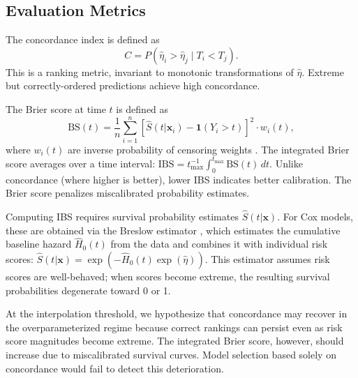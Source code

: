 \documentclass[12pt,a4paper]{article}
\newcommand{\bx}{\bm{x}}
\begin{document}
\subsection{Evaluation Metrics}

The concordance index \citep{harrell1996multivariable} is defined as
\begin{equation}
    C = P(\hat{\eta}_i > \hat{\eta}_j \mid T_i < T_j).
\end{equation}
This is a ranking metric, invariant to monotonic transformations of $\hat{\eta}$. Extreme but correctly-ordered predictions achieve high concordance.

The Brier score at time $t$ \citep{graf1999assessment} is defined as
\begin{equation}
    \text{BS}(t) = \frac{1}{n} \sum_{i=1}^{n} \left[ \hat{S}(t | \bx_i) - \mathbf{1}(Y_i > t) \right]^2 \cdot w_i(t),
\end{equation}
where $w_i(t)$ are inverse probability of censoring weights \citep{gerds2006consistent}. The integrated Brier score averages over a time interval: $\text{IBS} = t_{\max}^{-1} \int_0^{t_{\max}} \text{BS}(t) \, dt$. Unlike concordance (where higher is better), lower IBS indicates better calibration. The Brier score penalizes miscalibrated probability estimates.

Computing IBS requires survival probability estimates $\hat{S}(t | \bx)$. For Cox models, these are obtained via the Breslow estimator \citep{breslow1972contribution}, which estimates the cumulative baseline hazard $\hat{H}_0(t)$ from the data and combines it with individual risk scores: $\hat{S}(t | \bx) = \exp(-\hat{H}_0(t) \exp(\hat{\eta}))$. This estimator assumes risk scores are well-behaved; when scores become extreme, the resulting survival probabilities degenerate toward 0 or 1.

At the interpolation threshold, we hypothesize that concordance may recover in the overparameterized regime because correct rankings can persist even as risk score magnitudes become extreme. The integrated Brier score, however, should increase due to miscalibrated survival curves. Model selection based solely on concordance would fail to detect this deterioration.

\end{document}
